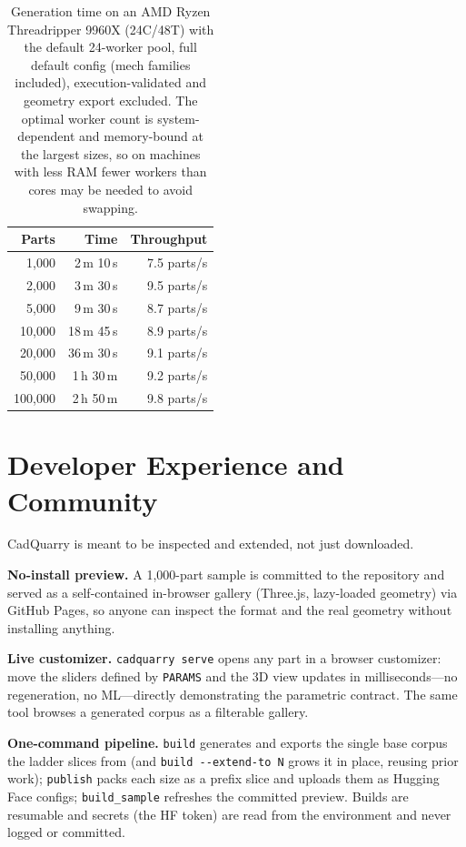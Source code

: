 \documentclass[11pt]{article}
\newcommand{\code}[1]{\texttt{#1}}
\begin{document}
\begin{table}[h]
\centering\small\setlength{\tabcolsep}{10pt}
\renewcommand{\arraystretch}{1.1}
\begin{tabular}{@{}r r r@{}}
\toprule
\textbf{Parts} & \textbf{Time} & \textbf{Throughput}\\
\midrule
1{,}000   & 2\,m 10\,s   & 7.5 parts/s\\
2{,}000   & 3\,m 30\,s   & 9.5 parts/s\\
5{,}000   & 9\,m 30\,s   & 8.7 parts/s\\
10{,}000  & 18\,m 45\,s  & 8.9 parts/s\\
20{,}000  & 36\,m 30\,s  & 9.1 parts/s\\
50{,}000  & 1\,h 30\,m   & 9.2 parts/s\\
100{,}000 & 2\,h 50\,m   & 9.8 parts/s\\
\bottomrule
\end{tabular}
\caption{Generation time on an AMD Ryzen Threadripper 9960X (24C/48T) with the
default 24-worker pool, full default config (mech families included),
execution-validated and geometry export excluded. The optimal worker count is
system-dependent and memory-bound at the largest sizes, so on machines with less
RAM fewer workers than cores may be needed to avoid swapping.}
\label{tab:perf}
\end{table}

\section{Developer Experience and Community}\label{sec:dx}
CadQuarry is meant to be inspected and extended, not just downloaded.

\textbf{No-install preview.} A 1{,}000-part sample is committed to the repository
and served as a self-contained in-browser gallery (Three.js, lazy-loaded
geometry) via GitHub Pages, so anyone can inspect the format and the real
geometry without installing anything.

\textbf{Live customizer.} \code{cadquarry serve} opens any part in a browser
customizer: move the sliders defined by \code{PARAMS} and the 3D view updates in
milliseconds---no regeneration, no ML---directly demonstrating the parametric
contract. The same tool browses a generated corpus as a filterable gallery.

\textbf{One-command pipeline.} \code{build} generates and exports the single base
corpus the ladder slices from (and \code{build~-{}-extend-to~N} grows it in place,
reusing prior work); \code{publish} packs each size as a prefix slice and uploads
them as Hugging Face configs; \code{build\_sample} refreshes the committed
preview. Builds are resumable and secrets (the HF token) are read from the
environment and never logged or committed.
\end{document}
